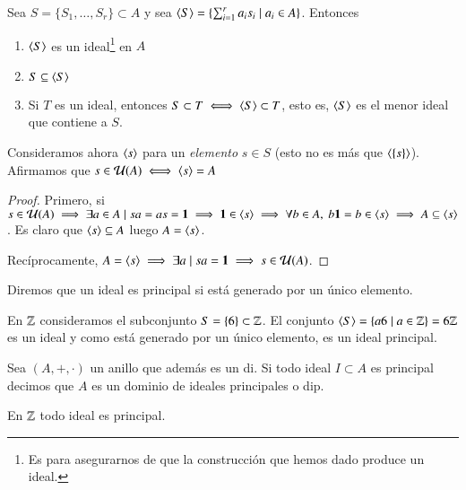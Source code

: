 \begin{pro}
	Sea $S = \{S_1, \dots, S_r\} \subset A$ y sea $\langle S\rangle = \{\sum_{i=1}^{r}a_is_i \mid a_i \in A\}$. Entonces
	\begin{enumerate}
		\item $\langle S\rangle$ es un ideal\footnote{Es para asegurarnos de que la construcción que hemos dado produce un ideal.} en $A$
		\item $S \subseteq \langle S\rangle$
		\item Si $T$ es un ideal, entonces $S \subset T \iff \langle S\rangle \subset T$, esto es, $\langle S\rangle$ es el menor ideal que contiene a $S$.
	\end{enumerate}
\end{pro}

\begin{pro}
	Consideramos ahora $\langle s\rangle$ para un \textit{elemento} $s \in S$ (esto no es más que $\langle\{s\}\rangle$). Afirmamos que $s \in \mathcal{U}(A) \iff \langle s\rangle = A$
\end{pro}

\begin{proof}
	\label{pro:inunidadesiffgenerado}
	Primero, si $s \in \mathcal{U}(A) \implies \exists a \in A \mid sa = as = \mathbf{1} \implies \mathbf{1} \in \langle s\rangle \implies \forall b \in A,\ b\mathbf{1} = b \in \langle s\rangle \implies A \subseteq \langle s\rangle$. Es claro que $\langle s\rangle \subseteq A$ luego $A = \langle s\rangle$.
	
	Recíprocamente, $A = \langle s\rangle \implies \exists a \mid sa = \mathbf{1} \implies s \in \mathcal{U}(A)$.
\end{proof}

\begin{dfn}
	Diremos que un ideal es principal si está generado por un único elemento.
\end{dfn}

\begin{ej}
	En $\mathbb{Z}$ consideramos el subconjunto $S = \{6\} \subset \mathbb{Z}$. El conjunto $\langle S\rangle = \{a6 \mid a \in \mathbb{Z}\} = 6\mathbb{Z}$ es un ideal y como está generado por un único elemento, es un ideal principal.
\end{ej}

\begin{dfn}
	\label{dfn:dominioidealesprincipales}
	Sea $(A, +, \cdot)$ un anillo que además es un \gls{di}. Si todo ideal $I \subset A$ es principal decimos que $A$ es un dominio de ideales principales o \gls{dip}.
\end{dfn}

\begin{obs}
	En $\mathbb{Z}$ todo ideal es principal.
\end{obs}

